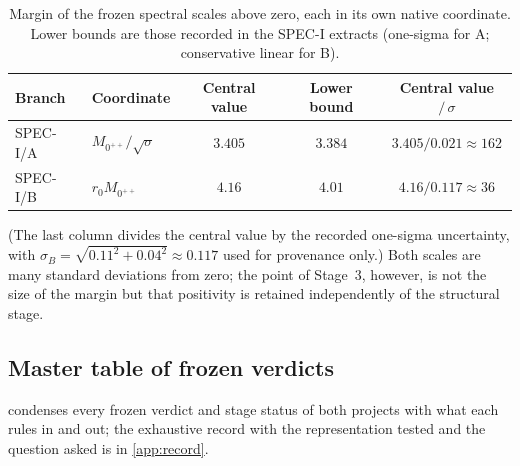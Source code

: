 \documentclass[11pt,a4paper]{article}
\theoremstyle{definition}
\theoremstyle{remark}
\newcommand{\sqs}{\sqrt{\sigma}}
\begin{document}
\begin{table}[t]
\centering\small
\caption{Margin of the frozen spectral scales above zero, each in its own native coordinate. Lower bounds are those recorded in the SPEC-I extracts (one-sigma for A; conservative linear for B).}\label{tab:margin}
\begin{tabular}{@{}llccc@{}}
\toprule
Branch & Coordinate & Central value & Lower bound & Central value $/\,\sigma$\\\midrule
SPEC-I/A & $M_{0^{++}}/\sqs$ & $3.405$ & $3.384$ & $3.405/0.021\approx162$\\
SPEC-I/B & $r_0M_{0^{++}}$ & $4.16$ & $4.01$ & $4.16/0.117\approx36$\\\bottomrule
\end{tabular}
\end{table}
(The last column divides the central value by the recorded one-sigma uncertainty, with $\sigma_B=\sqrt{0.11^2+0.04^2}\approx0.117$ used for provenance only.) Both scales are many standard deviations from zero; the point of Stage~3, however, is not the size of the margin but that positivity is retained independently of the structural stage.

\subsection{Master table of frozen verdicts}\label{sec:master}
 condenses every frozen verdict and stage status of both projects with what each rules in and out; the exhaustive record with the representation tested and the question asked is in \cref{app:record}.
\end{document}
